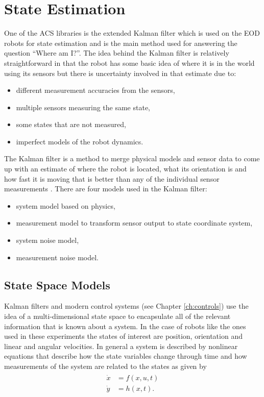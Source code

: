 \chapter{State Estimation}
\label{ch:estimation}
One of the ACS libraries is the extended Kalman filter which is used on the EOD robots for state estimation and is the main method used for answering the question ``Where am I?''. The idea behind the Kalman filter is relatively straightforward in that the robot has some basic idea of where it is in the world using its sensors but there is uncertainty involved in that estimate due to:
\begin{itemize}
\item different measurement accuracies from the sensors,
\item multiple sensors measuring the same state,
\item some states that are not measured,
\item imperfect models of the robot dynamics.
\end{itemize}

The Kalman filter is a method to merge physical models and sensor data to come up with an estimate of where the robot is located, what its orientation is and how fast it is moving that is better than any of the individual sensor measurements \cite{Simon06OptimalEstimation, Grewal08, Orderud05}. There are four models used in the Kalman filter:
\begin{itemize}
\item system model based on physics,
\item measurement model to transform sensor output to state coordinate system,
\item system noise model,
\item measurement noise model.
\end{itemize}

\section{State Space Models}
\label{sec:statespacemodels}
Kalman filters and modern control systems (see Chapter \ref{ch:controls}) use the idea of a multi-dimensional state space to encapsulate all of the relevant information that is known about a system. In the case of robots like the ones used in these experiments the states of interest are position, orientation and linear and angular velocities. In general a system is described by nonlinear equations that describe how the state variables change through time and how measurements of the system are related to the states as given by
\begin{align}
\label{eq:statespace}
\begin{split}
\dot{x} &= f(x,u,t) \\
\dot{y} &= h(x,t).
\end{split}
\end{align}

